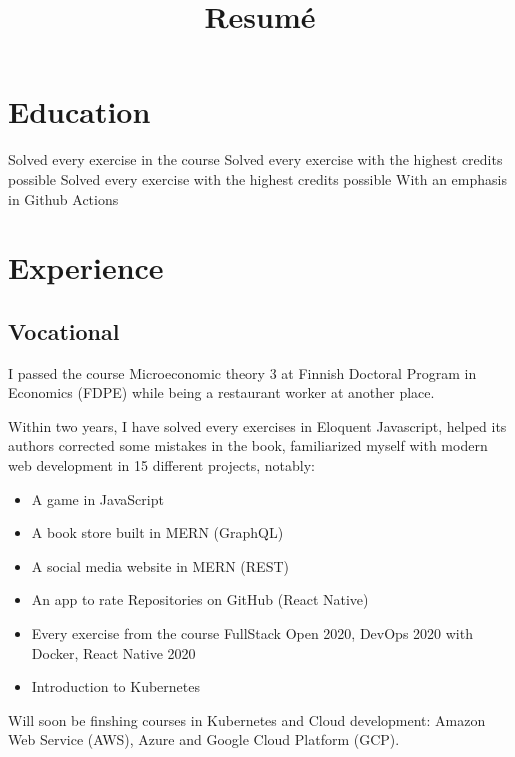 \documentclass[11pt,a4paper,sans]{moderncv}
\title{Resumé}
\begin{document}
  \makecvtitle

  \section{Education}
  {}
  {Solved every exercise in the course}
  {Solved every exercise with the highest credits possible}
  {Solved every exercise with the highest credits possible}
  {With an emphasis in Github Actions}
  {}

  \section{Experience}
  \subsection{Vocational}
  {}
  {I passed the course Microeconomic theory 3 at Finnish Doctoral Program in Economics (FDPE)
  while being a restaurant worker at another place.}
  {Within two years, I have solved every exercises in Eloquent Javascript, helped its authors
  corrected some mistakes in the book, familiarized myself with modern web
  development in 15 different projects, notably:
  \begin{itemize}
    \item A game in JavaScript
    \item A book store built in MERN (GraphQL)
    \item A social media website in MERN (REST)
    \item An app to rate Repositories on GitHub (React Native)
    \item Every exercise from the course FullStack Open 2020, DevOps 2020 with Docker,
    React Native 2020
    \item Introduction to Kubernetes
  \end{itemize}
  Will soon be finshing courses in Kubernetes and Cloud
  development: Amazon Web Service (AWS), Azure and Google Cloud Platform (GCP).
  }
\end{document}
